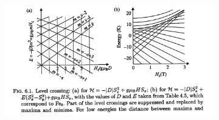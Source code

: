 \begin{figure}
    \centering
    \begin{subfigure}{0.77\linewidth}
        \includegraphics[width=\linewidth]{img/mn12_level_crossing.png}
    \end{subfigure}
    \begin{subfigure}{0.21\linewidth}

\end{subfigure}
\end{figure}

